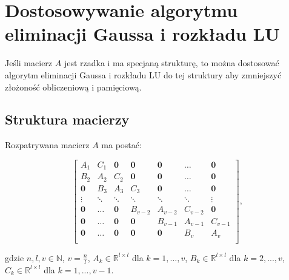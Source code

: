 \documentclass{article}
\begin{document}
\section{Dostosowywanie algorytmu eliminacji Gaussa i rozkładu LU}
Jeśli macierz $A$ jest rzadka i ma specjaną strukturę, to można dostosować algorytm eliminacji Gaussa i rozkładu LU do tej struktury aby zmniejszyć złożoność obliczeniową i pamięciową.

\subsection{Struktura macierzy}
Rozpatrywana macierz $A$ ma postać:
\begin{center}
    $$
    \begin{bmatrix}
        A_1 & C_1 & \textbf{0} & \textbf{0} & \textbf{0} & \dots & \textbf{0} \\
        B_2 & A_2 & C_2 & \textbf{0} & \textbf{0} & \dots & \textbf{0} \\
        \textbf{0} & B_3 & A_3 & C_3 & \textbf{0} & \dots & \textbf{0} \\
        \vdots & \ddots & \ddots & \ddots & \ddots & \ddots & \vdots \\
        \textbf{0} & \dots & \textbf{0} & B_{v-2} & A_{v-2} & C_{v-2} & \textbf{0} \\
        \textbf{0} & \dots & \textbf{0} & \textbf{0} & B_{v-1} & A_{v-1} & C_{v-1} \\
        \textbf{0} & \dots & \textbf{0} & \textbf{0} & \textbf{0} & B_v & A_v \\
    \end{bmatrix},
    $$
\end{center}
gdzie $n, l, v \in \mathbb{N}$, $v = \frac{n}{l}$, $A_k \in \mathbb{R}^{l \times l}$ dla $k = 1, ..., v$, $B_k \in \mathbb{R}^{l \times l}$ dla $k = 2, ..., v$, $C_k \in \mathbb{R}^{l \times l}$ dla $k = 1, ..., v-1$.
\end{document}
